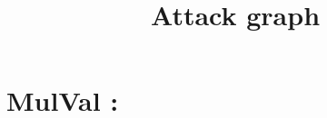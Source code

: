 \documentclass[10pt,a4paper]{article}
\author{}
\date{}
\title{Attack graph}
\begin{document}
\maketitle
\section{MulVal :}
\end{document}
